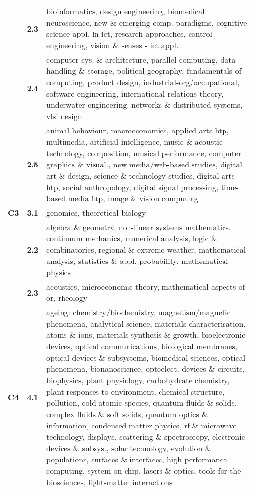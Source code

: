 \begin{spacing}{0.9}
\begin{longtable}[r]{r|r|p{11.5cm}}
& \textbf{2.3} & {bioinformatics, design engineering, biomedical neuroscience, new \& emerging comp. paradigms, cognitive science appl. in ict, research approaches, control engineering, vision \& senses - ict appl.}\\
& \textbf{2.4} & {computer sys. \& architecture, parallel computing, data handling \& storage, political geography, fundamentals of computing, product design, industrial-org/occupational, software engineering, international relations theory, underwater engineering, networks \& distributed systems, vlsi design}\\
& \textbf{2.5} & {animal behaviour, macroeconomics, applied arts htp, multimedia, artificial intelligence, music \& acoustic technology, composition, musical performance, computer graphics \& visual., new media/web-based studies, digital art \& design, science \& technology studies, digital arts htp, social anthropology, digital signal processing, time-based media htp, image \& vision computing}\\
\hline
\textbf{C3}
& \textbf{3.1} & {genomics, theoretical biology}\\
& \textbf{2.2} & {algebra \& geometry, non-linear systems mathematics, continuum mechanics, numerical analysis, logic \& combinatorics, regional \& extreme weather, mathematical analysis, statistics \& appl. probability, mathematical physics}\\
& \textbf{2.3} & {acoustics, microeconomic theory, mathematical aspects of or, rheology}\\
\hline
\textbf{C4}
& \textbf{4.1} & {ageing: chemistry/biochemistry, magnetism/magnetic phenomena, analytical science, materials characterisation, atoms \& ions, materials synthesis \& growth, bioelectronic devices, optical communications, biological membranes, optical devices \& subsystems, biomedical sciences, optical phenomena, bionanoscience, optoelect. devices \& circuits, biophysics, plant physiology, carbohydrate chemistry, plant responses to environment, chemical structure, pollution, cold atomic species, quantum fluids \& solids, complex fluids \& soft solids, quantum optics \& information, condensed matter physics, rf \& microwave technology, displays, scattering \& spectroscopy, electronic devices \& subsys., solar technology, evolution \& populations, surfaces \& interfaces, high performance computing, system on chip, lasers \& optics, tools for the biosciences, light-matter interactions}\\

\end{longtable}
\end{spacing}
